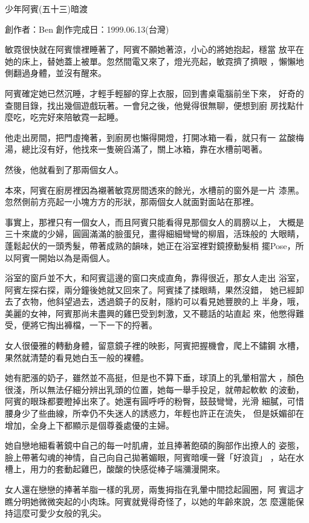 



少年阿賓(五十三)暗渡

創作者：Ben
創作完成日：1999.06.13(台灣)


敏霓很快就在阿賓懷裡睡著了，阿賓不願她著涼，小心的將她抱起，穩當
放平在她的床上，替她蓋上被單。忽然間電又來了，燈光亮起，敏霓擠了擠眼
，懶懶地側翻過身體，並沒有醒來。

阿賓確定她已然沉睡，才輕手輕腳的穿上衣服，回到書桌電腦前坐下來，
好奇的查閱目錄，找出幾個遊戲玩著。一會兒之後，他覺得很無聊，便想到廚
房找點什麼吃，吃完好來陪敏霓一起睡。

他走出房間，把門虛掩著，到廚房也懶得開燈，打開冰箱一看，就只有一
盆酸梅湯，總比沒有好，他找來一隻碗舀滿了，關上冰箱，靠在水槽前喝著。

然後，他就看到了那兩個女人。

本來，阿賓在廚房裡因為襯著敏霓房間透來的餘光，水槽前的窗外是一片
漆黑。忽然側前方亮起一小塊方方的形狀，那兩個女人就面對面站在那裡。

事實上，那裡只有一個女人，而且阿賓只能看得見那個女人的肩膀以上，
大概是三十來歲的少婦，圓圓滿滿的臉蛋兒，畫得細細彎彎的柳眉，活珠般的
大眼睛，蓬鬆起伏的一頭秀髮，帶著成熟的韻味，她正在浴室裡對鏡撩動髮梢
擺Pose，所以阿賓一開始以為是兩個人。

浴室的窗戶並不大，和阿賓這邊的窗口夾成直角，靠得很近，那女人走出
浴室，阿賓左探右探，兩分鐘後她就又回來了。阿賓揉了揉眼睛，果然沒錯，
她已經卸去了衣物，他斜望過去，透過鏡子的反射，隱約可以看見她豐腴的上
半身，哦，美麗的女神，阿賓那尚未盡興的雞巴受到刺激，又不聽話的站直起
來，他憋得難受，便將它掏出褲檔，一下一下的捋著。

女人很優雅的轉動身體，留意鏡子裡的映影，阿賓把握機會，爬上不鏽鋼
水槽，果然就清楚的看見她白玉一般的裸體。

她有肥漲的奶子，雖然並不高挺，但是也不算下垂，球頂上的乳暈相當大
，顏色很淺，所以無法仔細分辨出乳頭的位置，她每一舉手投足，就帶起軟軟
的波動，阿賓的眼珠都要瞪掉出來了。她還有圓呼呼的粉臀，鼓鼓彎彎，光滑
細膩，可惜腰身少了些曲線，所幸仍不失迷人的誘惑力，年輕也許正在流失，
但是妖媚卻在增加，全身上下都顯示是個尊養處優的主婦。

她自戀地細看著鏡中自己的每一吋肌膚，並且捧著飽碩的胸部作出撩人的
姿態，臉上帶著勾魂的神情，自己向自己拋著媚眼，阿賓暗嘆一聲「好浪貨」
，站在水槽上，用力的套動起雞巴，酸酸的快感從棒子端瀰漫開來。

女人還在戀戀的捧著羊脂一樣的乳房，兩隻拇指在乳暈中間捻起圓圈，阿
賓這才瞧分明她微微突起的小肉珠。阿賓就覺得奇怪了，以她的年齡來說，怎
麼還能保持這麼可愛少女般的乳尖。


